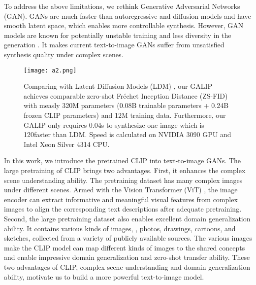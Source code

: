 \documentclass[10pt,twocolumn,letterpaper]{article}
\begin{document}
To address the above limitations, we rethink Generative Adversarial Networks (GAN). 
GANs are much faster than autoregressive and diffusion models and have smooth latent space, which enables more controllable synthesis.
However, GAN models are known for potentially unstable training and less diversity in the generation \cite{ding2021cogview}. 
It makes current text-to-image GANs suffer from unsatisfied synthesis quality under complex scenes.


\begin{figure*}[t] \small
  \centering
  \texttt{[image: a2.png]}
  \caption{Comparing with Latent Diffusion Models (LDM) \cite{rombach2022high}, our GALIP achieves comparable zero-shot Fr\'echet Inception Distance (ZS-FID) with measly 320M parameters (0.08B trainable parameters + 0.24B frozen CLIP parameters) and 12M training data. Furthermore, our GALIP only requires 0.04s to synthesize one image which is 120faster than LDM. Speed is calculated on NVIDIA 3090 GPU and Intel Xeon Silver 4314 CPU.}
  \label{fig1}
  \vspace{-0.4cm}
\end{figure*}


In this work, we introduce the pretrained CLIP \cite{radford2021learning} into text-to-image GANs.
The large pretraining of CLIP brings two advantages.
First, it enhances the complex scene understanding ability.
The pretraining dataset has many complex images under different scenes.
Armed with the Vision Transformer (ViT) \cite{dosovitskiy2020image}, the image encoder can extract informative and meaningful visual features from complex images to align the corresponding text descriptions after adequate pretraining.
Second, the large pretraining dataset also enables excellent domain generalization ability.
It contains various kinds of images, \eg, photos, drawings, cartoons, and sketches, collected from a variety of publicly available sources.
The various images make the CLIP model can map different kinds of images to the shared concepts and enable impressive domain generalization and zero-shot transfer ability.
These two advantages of CLIP, complex scene understanding and domain generalization ability, motivate us to build a more powerful text-to-image model.
\end{document}
